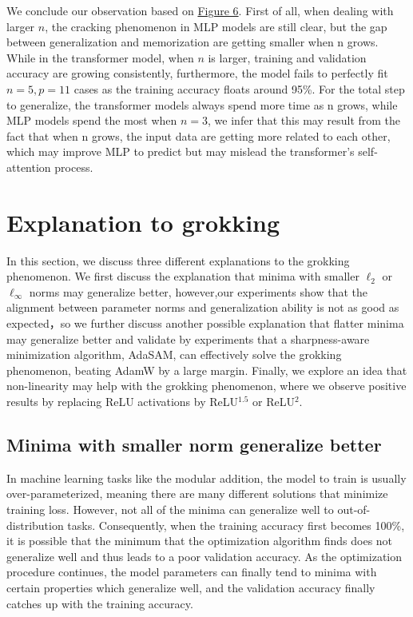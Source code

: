 \documentclass{article}
\begin{document}
We conclude our observation based on \hyperref[fig6:main]{Figure 6}. First of all, when dealing with larger $n$, the cracking phenomenon in MLP models are still clear, but the gap between generalization and memorization are getting smaller when n grows. While in the transformer model, when $n$ is larger, training and validation accuracy are growing consistently, furthermore, the model fails to perfectly fit $n=5,p=11$ cases as the training accuracy floats around 95\%.  For the total step to generalize, the transformer models always spend more time as n grows, while MLP models spend the most when $n=3$, we infer that this may result from the fact that when n grows, the input data are getting more related to each other, which may improve MLP to predict but may mislead the transformer's self-attention process.


\vspace{-1em}
\section{Explanation to grokking}
\vspace{-0.5em}
\label{headings}
In this section, we discuss three different explanations to the grokking phenomenon. We first discuss the explanation that minima with smaller $\ell_2$ or $\ell_\infty$ norms may generalize better, however,our experiments show that the alignment between parameter norms and generalization ability is not as good as expected，so we further discuss another possible explanation that flatter minima may generalize better and validate by experiments that a sharpness-aware minimization algorithm, AdaSAM, can effectively solve the grokking phenomenon, beating AdamW by a large margin. Finally, we explore an idea that non-linearity may help with the grokking phenomenon, where we observe positive results by replacing ReLU activations by ReLU$^{1.5}$ or ReLU$^2$.

\vspace{-1em}
\subsection{Minima with smaller norm generalize better}
\vspace{-1em}

In machine learning tasks like the modular addition, the model to train is usually over-parameterized, meaning there are many different solutions that minimize training loss. However, not all of the minima can generalize well to out-of-distribution tasks. Consequently, when the training accuracy first becomes 100\%, it is possible that the minimum that the optimization algorithm finds does not generalize well and thus leads to a poor validation accuracy. As the optimization procedure continues, the model parameters can finally tend to minima with certain properties which generalize well, and the validation accuracy finally catches up with the training accuracy.
\end{document}
